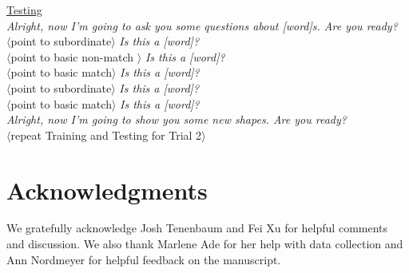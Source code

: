 \documentclass[man]{apa2}
\begin{document}
\noindent \underline{Testing} \\
{\it Alright, now I'm going to ask you some questions about [word]s. Are you ready?} \\
$\langle$point to subordinate$\rangle$ {\it Is this a [word]?} \\
$\langle$point to basic non-match $\rangle$ {\it Is this a [word]?} \\
$\langle$point to basic match$\rangle$ {\it Is this a [word]?}\\
$\langle$point to subordinate$\rangle$ {\it Is this a [word]?} \\
$\langle$point to basic match$\rangle$ {\it Is this a [word]?} \\
 
{\it Alright, now I'm going to show you some new shapes. Are you ready?}\\

\vspace{2.5mm}
\noindent $\langle$repeat Training and Testing for Trial 2$\rangle$ \\

\nocite{re2013}
\nocite{sanchez2003effect}

\section{Acknowledgments}

We gratefully acknowledge Josh Tenenbaum and Fei Xu for helpful comments and discussion. We also thank Marlene Ade for her help with data collection and Ann Nordmeyer for helpful feedback on the manuscript. 





\newpage
\theappendix 
\end{document}
